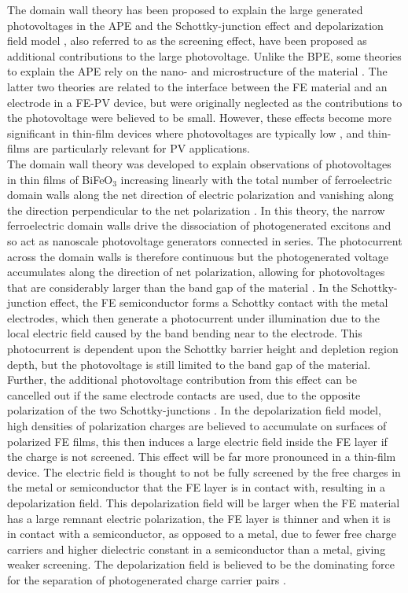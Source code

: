 The domain wall theory has been proposed to explain the large generated photovoltages in the APE \cite{domain_wall} and the Schottky-junction effect \cite{schottky_effect} and depolarization field model \cite{screen_effect, depol_model}, also referred to as the screening effect, have been proposed as additional contributions to the large photovoltage. Unlike the BPE, some theories to explain the APE rely on the nano- and microstructure of the material \cite{keith}. The latter two theories are related to the interface between the FE material and an electrode in a FE-PV device, but were originally neglected as the contributions to the photovoltage were believed to be small. However, these effects become more significant in thin-film devices where photovoltages are typically low \cite{FE_PV_rev1}, and thin-films are particularly relevant for PV applications.\\

The domain wall theory was developed to explain observations of photovoltages in thin films of BiFeO$_3$ increasing linearly with the total number of ferroelectric domain walls along the net direction of electric polarization and vanishing along the direction perpendicular to the net polarization \cite{rev_30}. In this theory, the narrow ferroelectric domain walls drive the dissociation of photogenerated excitons and so  act as nanoscale photovoltage generators connected in series. The photocurrent across the domain walls is therefore continuous but the photogenerated voltage accumulates along the direction of net polarization, allowing for photovoltages that are considerably larger than the band gap of the material \cite{FE_PV_rev1}.
In the Schottky-junction effect, the FE semiconductor forms a Schottky contact with the metal electrodes, which then generate a photocurrent under illumination due to the local electric field caused by the band bending near to the electrode. This photocurrent is dependent upon the Schottky barrier height and depletion region depth, but the photovoltage is still limited to the band gap of the material. Further, the additional photovoltage contribution from this effect can be cancelled out if the same electrode contacts are used, due to the opposite polarization of the two Schottky-junctions \cite{FE_PV_rev1}.
In the depolarization field model, high densities of polarization charges are believed to accumulate on surfaces of polarized FE films, this then induces a large electric field inside the FE layer if the charge is not screened. This effect will be far more pronounced in a thin-film device. The electric field is thought to not be fully screened by the free charges in the metal or semiconductor that the FE layer is in contact with, resulting in a depolarization field. This depolarization field will be larger when the FE material has a large remnant electric polarization, the FE layer is thinner and when it is in contact with a semiconductor, as opposed to a metal, due to fewer free charge carriers and higher dielectric constant in a semiconductor than a metal, giving weaker screening. The depolarization field is believed to be the dominating force for the separation of photogenerated charge carrier pairs \cite{FE_PV_rev1}.\\

